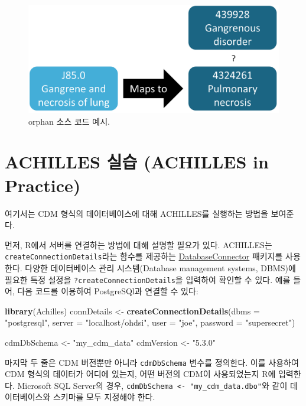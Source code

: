 \documentclass[11pt]{book}
\newenvironment{Shaded}{\begin{snugshade}}{\end{snugshade}}
\newcommand{\KeywordTok}[1]{\textcolor[rgb]{0.13,0.29,0.53}{\textbf{#1}}}
\newcommand{\DataTypeTok}[1]{\textcolor[rgb]{0.13,0.29,0.53}{#1}}
\newcommand{\StringTok}[1]{\textcolor[rgb]{0.31,0.60,0.02}{#1}}
\newcommand{\NormalTok}[1]{#1}
\theoremstyle{definition}
\theoremstyle{definition}
\theoremstyle{definition}
\theoremstyle{remark}
\begin{document}
\begin{figure}

{\centering \includegraphics[width=0.7\linewidth]{images/DataQuality/missingMapping} 

}

\caption{orphan 소스 코드 예시. }\label{fig:missingMapping}
\end{figure}

\section{ACHILLES 실습 (ACHILLES in Practice)}\label{achillesInPractice}

여기서는 CDM 형식의 데이터베이스에 대해 ACHILLES를 실행하는 방법을
보여준다.

먼저, R에서 서버를 연결하는 방법에 대해 설명할 필요가 있다. ACHILLES는
\texttt{createConnectionDetails}라는 함수를 제공하는
\href{https://ohdsi.github.io/DatabaseConnector/}{DatabaseConnector}
패키지를 사용한다. 다양한 데이터베이스 관리 시스템(Database management
systems, DBMS)에 필요한 특정 설정을 \texttt{?createConnectionDetails}을
입력하여 확인할 수 있다. 예를 들어, 다음 코드를 이용하여 PostgreSQl과
연결할 수 있다:

\begin{Shaded}
\begin{Highlighting}[]
\KeywordTok{library}\NormalTok{(Achilles)}
\NormalTok{connDetails <-}\StringTok{ }\KeywordTok{createConnectionDetails}\NormalTok{(}\DataTypeTok{dbms =} \StringTok{"postgresql"}\NormalTok{,}
                                       \DataTypeTok{server =} \StringTok{"localhost/ohdsi"}\NormalTok{,}
                                       \DataTypeTok{user =} \StringTok{"joe"}\NormalTok{,}
                                       \DataTypeTok{password =} \StringTok{"supersecret"}\NormalTok{)}

\NormalTok{cdmDbSchema <-}\StringTok{ "my_cdm_data"}
\NormalTok{cdmVersion <-}\StringTok{ "5.3.0"}
\end{Highlighting}
\end{Shaded}

마지막 두 줄은 CDM 버전뿐만 아니라 \texttt{cdmDbSchema} 변수를 정의한다.
이를 사용하여 CDM 형식의 데이터가 어디에 있는지, 어떤 버전의 CDM이
사용되었는지 R에 입력한다. Microsoft SQL Server의 경우,
\texttt{cdmDbSchema\ \textless{}-\ "my\_cdm\_data.dbo"}와 같이
데이터베이스와 스키마를 모두 지정해야 한다.
\end{document}
